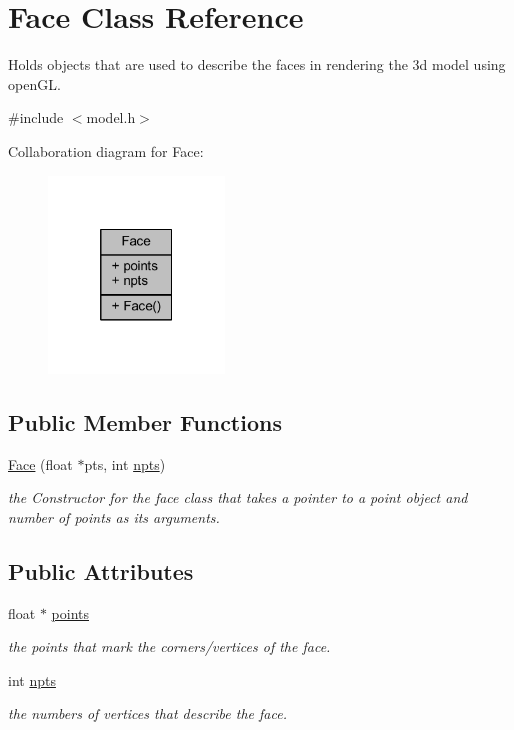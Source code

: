 \hypertarget{class_face}{}\section{Face Class Reference}
\label{class_face}


Holds objects that are used to describe the faces in rendering the 3d model using open\+GL.  




{\ttfamily \#include $<$model.\+h$>$}



Collaboration diagram for Face\+:\nopagebreak
\begin{figure}[H]
\begin{center}
\leavevmode
\includegraphics[width=133pt]{class_face__coll__graph}
\end{center}
\end{figure}
\subsection*{Public Member Functions}
\begin{DoxyCompactItemize}
\item 
\mbox{\hyperlink{class_face_a890f52c15855e434e6c0f853bcf7f40d}{Face}} (float $\ast$pts, int \mbox{\hyperlink{class_face_ac35360914de7ce1903058a598b9fe7ab}{npts}})
\begin{DoxyCompactList}\small\item\em the Constructor for the face class that takes a pointer to a point object and number of points as its arguments. \end{DoxyCompactList}\end{DoxyCompactItemize}
\subsection*{Public Attributes}
\begin{DoxyCompactItemize}
\item 
float $\ast$ \mbox{\hyperlink{class_face_a402240ad45f918a772d83f3022f9589f}{points}}
\begin{DoxyCompactList}\small\item\em the points that mark the corners/vertices of the face. \end{DoxyCompactList}\item 
int \mbox{\hyperlink{class_face_ac35360914de7ce1903058a598b9fe7ab}{npts}}
\begin{DoxyCompactList}\small\item\em the numbers of vertices that describe the face. \end{DoxyCompactList}\end{DoxyCompactItemize}



